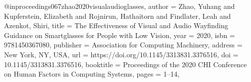 @inproceedings{067zhao2020visualaudioglasses,
author = {Zhao, Yuhang and Kupferstein, Elizabeth and Rojnirun, Hathaitorn and Findlater, Leah and Azenkot, Shiri},
title = {The Effectiveness of Visual and Audio Wayfinding Guidance on Smartglasses for People with Low Vision},
year = {2020},
isbn = {9781450367080},
publisher = {Association for Computing Machinery},
address = {New York, NY, USA},
url = {https://doi.org/10.1145/3313831.3376516},
doi = {10.1145/3313831.3376516},
booktitle = {Proceedings of the 2020 CHI Conference on Human Factors in Computing Systems},
pages = {1–14},
}